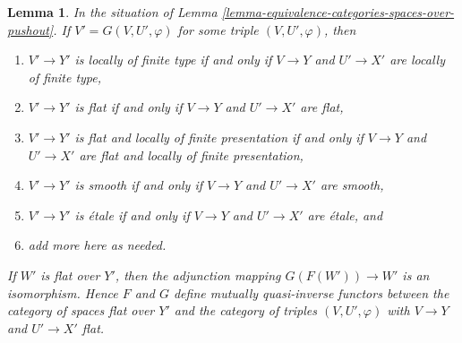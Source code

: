 \documentclass{stacks-project}
\theoremstyle{plain}
\newtheorem{lemma}[subsection]{Lemma}
\theoremstyle{definition}
\theoremstyle{remark}
\numberwithin{equation}{subsection}
\begin{document}
\begin{lemma}
\label{lemma-equivalence-categories-spaces-pushout-flat}
In the situation of
Lemma \ref{lemma-equivalence-categories-spaces-over-pushout}.
If $V' = G(V, U', \varphi)$ for some triple $(V, U', \varphi)$, then
\begin{enumerate}
\item $V' \to Y'$ is locally of finite type if and only if $V \to Y$ and
$U' \to X'$ are locally of finite type,
\item $V' \to Y'$ is flat if and only if $V \to Y$ and $U' \to X'$ are flat,
\item $V' \to Y'$ is flat and locally of finite presentation if and only if
$V \to Y$ and $U' \to X'$ are flat and locally of finite presentation,
\item $V' \to Y'$ is smooth if and only if $V \to Y$ and $U' \to X'$ are smooth,
\item $V' \to Y'$ is \'etale if and only if $V \to Y$ and $U' \to X'$
are \'etale, and
\item add more here as needed.
\end{enumerate}
If $W'$ is flat over $Y'$, then the adjunction mapping
$G(F(W')) \to W'$ is an isomorphism. Hence $F$ and $G$ define mutually
quasi-inverse functors between the category of spaces flat over $Y'$
and the category of triples $(V, U', \varphi)$ with $V \to Y$
and $U' \to X'$ flat.
\end{lemma}
\end{document}
